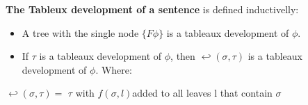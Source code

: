 \documentclass[runningheads]{llncs}
\begin{document}
\begin{definition}
    \textbf{The Tableux development of a sentence } is defined inductivelly: 
    \begin{itemize}
        \item A tree with the single node $\{F \phi \}$ is a tableaux development of $\phi$. 
        \item If $\tau$ is a tableaux development of $\phi$, then $\hookleftarrow(\sigma,\tau)$ is a tableaux development of $\phi$. Where:
    \end{itemize}

    $\hookleftarrow(\sigma,\tau) = $ $\tau$ with $f(\sigma, l) $added to all leaves l that contain $\sigma$

\end{definition}


\end{document}
